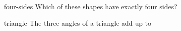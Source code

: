 \begin{questionmult}{four-sides}
  Which of these shapes have exactly four sides?
  \begin{choices}
  \end{choices}
\end{questionmult}

\begin{question}{triangle}
  The three angles of a triangle add up to
  \begin{choices}
  \end{choices}
\end{question}
